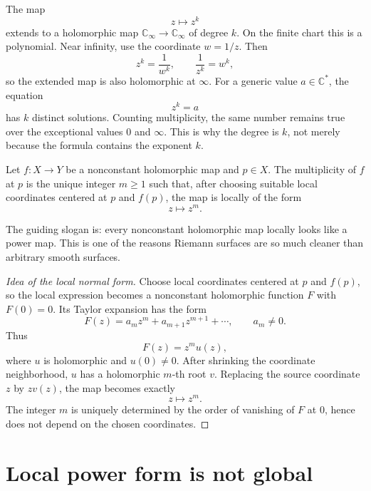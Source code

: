 \begin{example}
The map
\[
  z\mapsto z^k
\]
extends to a holomorphic map \(\mathbb C_\infty\to\mathbb C_\infty\) of degree \(k\).  On the finite chart this is a polynomial.  Near infinity, use the coordinate \(w=1/z\).  Then
\[
  z^k=\frac1{w^k},
  \qquad
  \frac1{z^k}=w^k,
\]
so the extended map is also holomorphic at \(\infty\).  For a generic value \(a\in\mathbb C^*\), the equation
\[
  z^k=a
\]
has \(k\) distinct solutions.  Counting multiplicity, the same number remains true over the exceptional values \(0\) and \(\infty\).  This is why the degree is \(k\), not merely because the formula contains the exponent \(k\).
\end{example}

\begin{definition}
Let \(f:X\to Y\) be a nonconstant holomorphic map and \(p\in X\).  The multiplicity of \(f\) at \(p\) is the unique integer \(m\ge1\) such that, after choosing suitable local coordinates centered at \(p\) and \(f(p)\), the map is locally of the form
\[
  z\mapsto z^m.
\]
\end{definition}

\begin{remark}
The guiding slogan is: every nonconstant holomorphic map locally looks like a power map.  This is one of the reasons Riemann surfaces are so much cleaner than arbitrary smooth surfaces.
\end{remark}

\begin{proof}[Idea of the local normal form]
Choose local coordinates centered at \(p\) and \(f(p)\), so the local expression becomes a nonconstant holomorphic function \(F\) with \(F(0)=0\).  Its Taylor expansion has the form
\[
  F(z)=a_mz^m+a_{m+1}z^{m+1}+\cdots,
  \qquad a_m\neq0.
\]
Thus
\[
  F(z)=z^m u(z),
\]
where \(u\) is holomorphic and \(u(0)\neq0\).  After shrinking the coordinate neighborhood, \(u\) has a holomorphic \(m\)-th root \(v\).  Replacing the source coordinate \(z\) by \(zv(z)\), the map becomes exactly
\[
  z\mapsto z^m.
\]
The integer \(m\) is uniquely determined by the order of vanishing of \(F\) at \(0\), hence does not depend on the chosen coordinates.
\end{proof}

\section{Local power form is not global}

